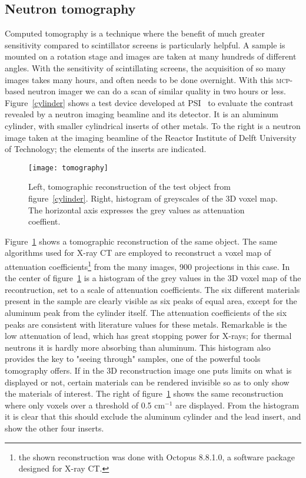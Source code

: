 \documentclass[a4paper,11pt]{article}
\begin{document}
\subsection{Neutron tomography}
Computed tomography is a technique where the benefit of much greater sensitivity compared to scintillator screens is particularly helpful.
A sample is mounted on a rotation stage and images are taken at many hundreds of different angles.
With the sensitivity of scintillating screens, the acquisition of so many images takes many hours, and often needs to be done overnight.
With this \textsc{mcp}-based neutron imager we can do a scan of similar quality in two hours or less.
Figure~\ref{cylinder} shows a test device developed at PSI~\cite{tomography} to evaluate the contrast revealed by a neutron imaging beamline and its detector.
It is an aluminum cylinder, with smaller cylindrical inserts of other metals.
To the right is a neutron image taken at the imaging beamline of the Reactor Institute of Delft University of Technology; the elements of the inserts are indicated.
\begin{figure}[tb]
	\centering\texttt{[image: tomography]}
	\caption{Left, tomographic reconstruction of the test object from figure~\ref{cylinder}. Right, histogram of greyscales of the 3D voxel map. The horizontal axis expresses the grey values as attenuation coeffient.\label{tomography}}
\end{figure}

Figure~\ref{tomography} shows a tomographic reconstruction of the same object.
The same algorithms used for X-ray CT are employed to reconstruct a voxel map of attenuation coefficients\footnote{the shown reconstruction was done with Octopus 8.8.1.0, a software package designed for X-ray CT.} from the many images, 900 projections in this case.
In the center of figure~\ref{tomography} is a histogram of the grey values in the 3D voxel map of the recontruction, set to a scale of attenuation coefficients.
The six different materials present in the sample are clearly visible as six peaks of equal area, except for the aluminum peak from the cylinder itself.
The attenuation coefficients of the six peaks are consistent with literature values for these metals.
Remarkable is the low attenuation of lead, which has great stopping power for X-rays; for thermal neutrons it is hardly more absorbing than aluminum.
This histogram also provides the key to "seeing through" samples, one of the powerful tools tomography offers.
If in the 3D reconstruction image one puts limits on what is displayed or not, certain materials can be rendered invisible so as to only show the materials of interest.
The right of figure~\ref{tomography} shows the same reconstruction where only voxels over a threshold of 0.5 cm$^{-1}$ are displayed.
From the histogram it is clear that this should exclude the aluminum cylinder and the lead insert, and show the other four inserts.
\end{document}
